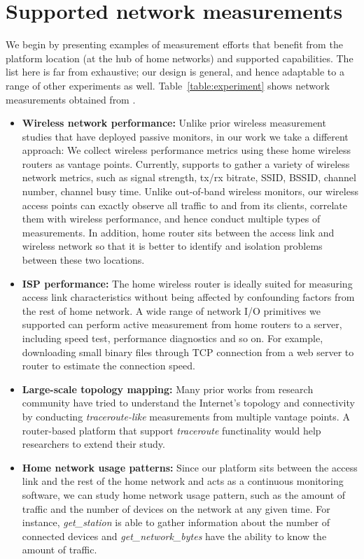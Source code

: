 \section{Supported network measurements}
\label{sec.network_measurement}
We begin by presenting examples of measurement efforts that benefit from the platform location (at the hub of home networks) and supported capabilities. The list here is far from exhaustive; our design is general, and hence adaptable to a range of other experiments as well. Table~\ref{table:experiment} shows network measurements obtained from \sysname.

\begin{itemize}
\item \textbf{Wireless network performance:} Unlike prior wireless measurement studies that have deployed passive monitors\cite{mahajan2006analyzing}\cite{raghavendra2009wi}\cite{papagiannaki2006experimental}, in our work we take a different approach: We collect wireless performance metrics using these home wireless routers as vantage points. Currently, \sysname supports to gather a variety of wireless network metrics, such as signal strength, tx/rx bitrate, SSID, BSSID, channel number, channel busy time.  Unlike out-of-band wireless monitors, our wireless access points can exactly observe all traffic to and from its clients, correlate them with wireless performance, and hence conduct multiple types of measurements. In addition, home router sits between the access link and wireless network so that it is better to identify and isolation problems between these two locations.

\item \textbf{ISP performance:} The home wireless router is ideally suited for measuring access link characteristics without being affected by confounding factors from the rest of home network. A wide range of network I/O primitives we supported can perform active measurement from home routers to a server, including speed test, performance diagnostics and so on. For example, downloading small binary files through TCP connection from a web server to router to estimate the connection speed.

\item \textbf{Large-scale topology mapping:} Many prior works from research community have tried to understand the Internet's topology and connectivity by conducting \textit{traceroute-like} measurements from multiple vantage points.\cite{paxson1996end}\cite{chen2009sidewalk} A router-based platform that support \textit{traceroute} functinality would help researchers to extend their study.

\item \textbf{Home network usage patterns:} Since our platform sits between the access link and the rest of the home network and acts as a continuous monitoring software, we can study home network usage pattern, such as the amount of traffic and the number of devices on the network at any given time. For instance, \textit{get\_station} is able to gather information about the number of connected devices and \textit{get\_network\_bytes} have the ability to know the amount of traffic.    
\end{itemize} 

